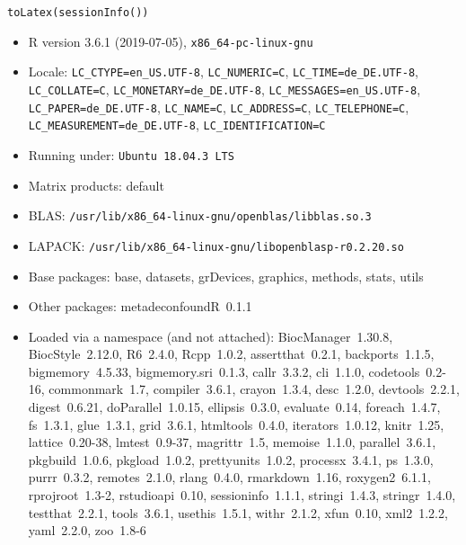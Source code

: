 \documentclass{article}\usepackage[]{graphicx}\usepackage[usenames,dvipsnames]{color}
\newcommand{\hlstd}[1]{\textcolor[rgb]{0.251,0.251,0.251}{#1}}%
\newcommand{\hlkwd}[1]{\textcolor[rgb]{0.878,0.439,0.125}{#1}}%
\begin{document}
\begin{kframe}
\begin{alltt}
\hlkwd{toLatex}\hlstd{(}\hlkwd{sessionInfo}\hlstd{())}
\end{alltt}
\end{kframe}\begin{itemize}\raggedright
  \item R version 3.6.1 (2019-07-05), \verb|x86_64-pc-linux-gnu|
  \item Locale: \verb|LC_CTYPE=en_US.UTF-8|, \verb|LC_NUMERIC=C|, \verb|LC_TIME=de_DE.UTF-8|, \verb|LC_COLLATE=C|, \verb|LC_MONETARY=de_DE.UTF-8|, \verb|LC_MESSAGES=en_US.UTF-8|, \verb|LC_PAPER=de_DE.UTF-8|, \verb|LC_NAME=C|, \verb|LC_ADDRESS=C|, \verb|LC_TELEPHONE=C|, \verb|LC_MEASUREMENT=de_DE.UTF-8|, \verb|LC_IDENTIFICATION=C|
  \item Running under: \verb|Ubuntu 18.04.3 LTS|
  \item Matrix products: default
  \item BLAS:   \verb|/usr/lib/x86_64-linux-gnu/openblas/libblas.so.3|
  \item LAPACK: \verb|/usr/lib/x86_64-linux-gnu/libopenblasp-r0.2.20.so|
  \item Base packages: base, datasets, grDevices, graphics, methods,
    stats, utils
  \item Other packages: metadeconfoundR~0.1.1
  \item Loaded via a namespace (and not attached):
    BiocManager~1.30.8, BiocStyle~2.12.0, R6~2.4.0, Rcpp~1.0.2,
    assertthat~0.2.1, backports~1.1.5, bigmemory~4.5.33,
    bigmemory.sri~0.1.3, callr~3.3.2, cli~1.1.0, codetools~0.2-16,
    commonmark~1.7, compiler~3.6.1, crayon~1.3.4, desc~1.2.0,
    devtools~2.2.1, digest~0.6.21, doParallel~1.0.15,
    ellipsis~0.3.0, evaluate~0.14, foreach~1.4.7, fs~1.3.1,
    glue~1.3.1, grid~3.6.1, htmltools~0.4.0, iterators~1.0.12,
    knitr~1.25, lattice~0.20-38, lmtest~0.9-37, magrittr~1.5,
    memoise~1.1.0, parallel~3.6.1, pkgbuild~1.0.6, pkgload~1.0.2,
    prettyunits~1.0.2, processx~3.4.1, ps~1.3.0, purrr~0.3.2,
    remotes~2.1.0, rlang~0.4.0, rmarkdown~1.16, roxygen2~6.1.1,
    rprojroot~1.3-2, rstudioapi~0.10, sessioninfo~1.1.1,
    stringi~1.4.3, stringr~1.4.0, testthat~2.2.1, tools~3.6.1,
    usethis~1.5.1, withr~2.1.2, xfun~0.10, xml2~1.2.2, yaml~2.2.0,
    zoo~1.8-6
\end{itemize}
\end{document}
